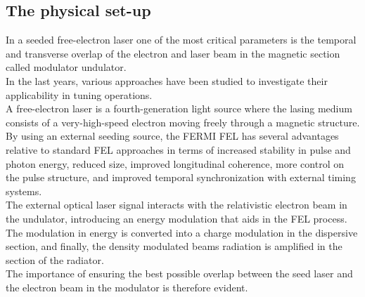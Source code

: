 \documentclass[
reprint,
amsmath,amssymb,amsfonts,clevref,
aps,
prstab,
]{revtex4-2}
\begin{document}
	\subsection{The physical set-up}
	In a seeded free-electron laser one of the most critical parameters is the temporal and transverse overlap of the electron and laser beam in the magnetic section called modulator undulator.\\
In the last years, various approaches have been studied to investigate their applicability in tuning operations. \\
	A free-electron laser is a fourth-generation light source where the lasing medium consists of a very-high-speed electron moving freely through a magnetic structure. By using an external seeding source, the FERMI FEL has several advantages relative to standard FEL approaches in terms of increased stability in pulse and photon energy, reduced size, improved longitudinal coherence, more control on the pulse structure, and improved temporal synchronization with external timing systems.\\
The external optical laser signal interacts with the relativistic electron beam in the undulator, introducing an energy modulation that aids in the FEL process. The modulation in energy is converted into a charge modulation in the dispersive section, and finally, the density modulated beams radiation is amplified in the section of the radiator.\\
	 The importance of ensuring the best possible overlap between the seed laser and the electron beam in the modulator is therefore evident.\\
\end{document}
